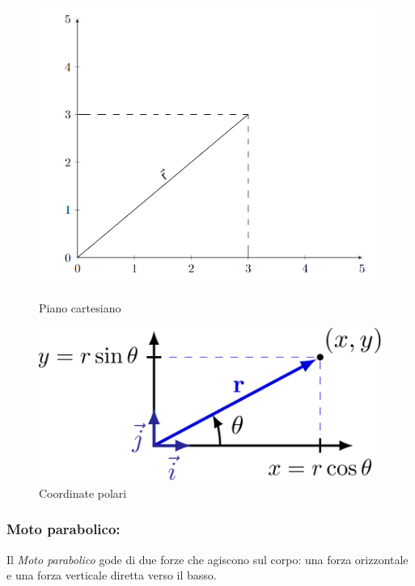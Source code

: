 \begin{figure}[tb]
\centering
\begin{minipage}[c]{0.50\textwidth}
\centering
\includegraphics[width=1\textwidth]{image/ccartesiane}
\caption{Piano cartesiano}
\label{coordinateCartesiane}
\end{minipage}%
\hspace{0mm}%
\begin{minipage}[c]{0.50\textwidth}
\centering
\includegraphics[width=1\textwidth]{image/coordPolari2.png}
\caption{Coordinate polari}
\label{img:coordPolari}
\end{minipage}
\end{figure}

\paragraph{}
\subsubsection{Moto parabolico:}
Il \textit{Moto parabolico} gode di due forze che agiscono sul corpo: una forza orizzontale e una forza verticale diretta verso il basso.

